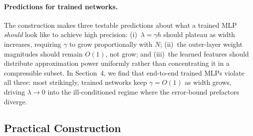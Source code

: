 \documentclass{article}
\begin{document}
\begin{table}[t]
\centering
\caption{Comparison of parameter count, working-precision bit complexity, and weight magnitudes for prior MLP constructions on analytic targets.}
\label{tab:comparison}
\small
\setlength{\tabcolsep}{4pt}
\end{table}

\paragraph{Predictions for trained networks.}
The construction makes three testable predictions about what a trained MLP \emph{should} look like to achieve high precision: (i)~\(\lambda = \gamma h\) should plateau as width increases, requiring \(\gamma\) to grow proportionally with \(N\); (ii)~the outer-layer weight magnitudes should remain \(O(1)\), not grow; and (iii)~the learned features should distribute approximation power uniformly rather than concentrating it in a compressible subset.  In Section~4, we find that end-to-end trained MLPs violate all three: most strikingly, trained networks keep \(\gamma = O(1)\) as width grows, driving \(\lambda \to 0\) into the ill-conditioned regime where the error-bound prefactors diverge.

\subsection{Practical Construction}
\label{subsec:practical-construction}
\end{document}

